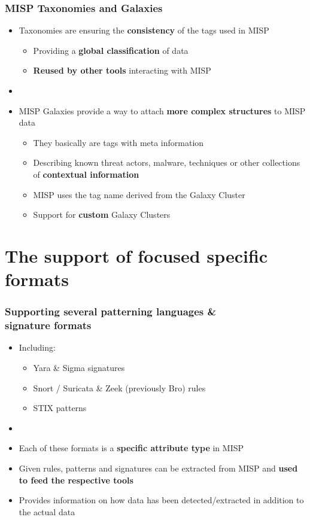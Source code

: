 \begin{frame}
    \frametitle{MISP Taxonomies and Galaxies}
    \begin{itemize}
        \item Taxonomies are ensuring the \textbf{consistency} of the tags used in MISP
        \begin{itemize}
            \item Providing a \textbf{global classification} of data
            \item \textbf{Reused by other tools} interacting with MISP
        \end{itemize}
        \item []
        \item MISP Galaxies provide a way to attach \textbf{more complex structures} to MISP data
        \begin{itemize}
            \item They basically are tags with meta information
            \item Describing known threat actors, malware, techniques or other collections of \textbf{contextual information}
            \item MISP uses the tag name derived from the Galaxy Cluster
            \item Support for \textbf{custom} Galaxy Clusters
        \end{itemize}
    \end{itemize}
\end{frame}

\section{The support of focused specific formats}

\begin{frame}
    \frametitle{Supporting several patterning languages \& \\ signature formats}
    \begin{itemize}
        \item Including:
        \begin{itemize}
            \item Yara \& Sigma signatures
            \item Snort / Suricata \& Zeek (previously Bro) rules
            \item STIX patterns
        \end{itemize}
        \item []
        \item Each of these formats is a \textbf{specific attribute type} in MISP
        \item Given rules, patterns and signatures can be extracted from MISP and \textbf{used to feed the respective tools}
        \item Provides information on how data has been detected/extracted in addition to the actual data
    \end{itemize}
\end{frame}

